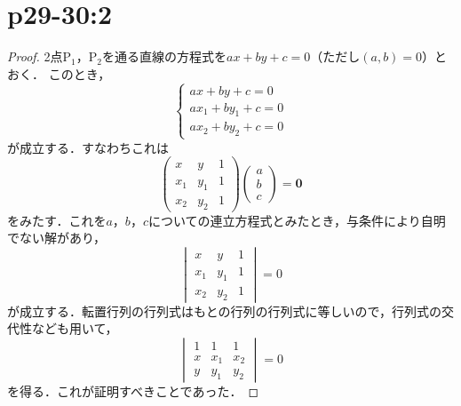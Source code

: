 \documentclass[a4paper,10pt,fleqn]{ltjsarticle}
\begin{document}
\section*{p29-30:2}

\begin{tleftbar}
    \begin{proof}
        2点$\mathrm{P}_1$，$\mathrm{P_2}$を通る直線の方程式を$ax+by+c=0$（ただし$(a,b)=0$）とおく．
        このとき，
        \[
            \begin{cases}
                ax+by+c =0       \\
                ax_1 + by_1 +c=0 \\
                ax_2 + by_2 +c =0
            \end{cases}
        \]
        が成立する．すなわちこれは
        \[
            \begin{pmatrix}
                x   & y   & 1 \\
                x_1 & y_1 & 1 \\
                x_2 & y_2 & 1
            \end{pmatrix}
            \begin{pmatrix}
                a \\
                b \\
                c
            \end{pmatrix}
            = \bm{0}
        \]
        をみたす．これを$a$，$b$，$c$についての連立方程式とみたとき，与条件により自明でない解があり，
        \[
            \begin{vmatrix}
                x   & y   & 1 \\
                x_1 & y_1 & 1 \\
                x_2 & y_2 & 1
            \end{vmatrix}
            =0
        \]
        が成立する．転置行列の行列式はもとの行列の行列式に等しいので，行列式の交代性なども用いて，
        \[
            \begin{vmatrix}
                1 & 1   & 1   \\
                x & x_1 & x_2 \\
                y & y_1 & y_2
            \end{vmatrix}
            =0
        \]
        を得る．これが証明すべきことであった．
    \end{proof}
\end{tleftbar}
\end{document}
